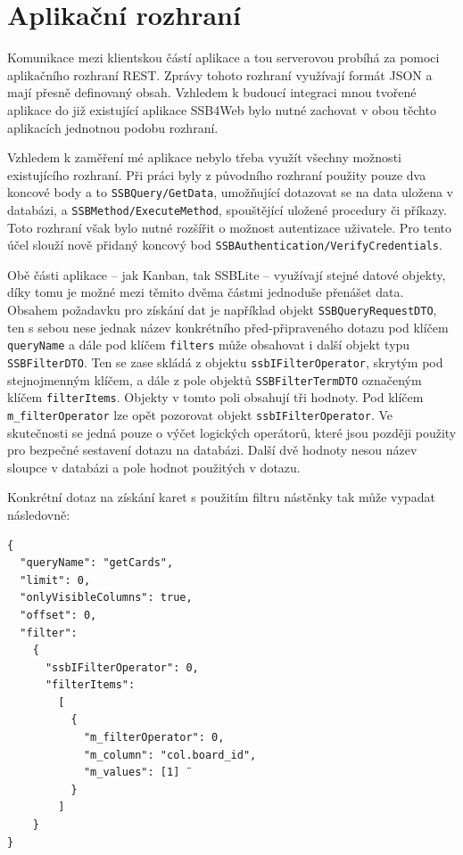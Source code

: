 \section{Aplikační rozhraní}\label{sec:api}
Komunikace mezi klientskou částí aplikace a tou serverovou probíhá za pomoci aplikačního rozhraní REST. Zprávy tohoto rozhraní využívají formát JSON a mají přesně definovaný obsah.
Vzhledem k budoucí integraci mnou tvořené aplikace do již existující aplikace SSB4Web bylo nutné zachovat v obou těchto aplikacích jednotnou podobu rozhraní.

Vzhledem k zaměření mé aplikace nebylo třeba využít všechny možnosti existujícího rozhraní. Při práci byly z původního rozhraní použity pouze dva koncové body a to \texttt{SSBQuery/GetData}, umožňující dotazovat se na data uložena v databázi, a \sloppy\texttt{SSBMethod/ExecuteMethod}, spouštějící uložené procedury či příkazy. Toto rozhraní však bylo nutné rozšířit o možnost autentizace uživatele. Pro tento účel slouží nově přidaný koncový bod \sloppy\texttt{SSBAuthentication/VerifyCredentials}.

Obě části aplikace -- jak Kanban, tak SSBLite -- využívají stejné datové objekty, díky tomu je možné mezi těmito dvěma částmi jednoduše přenášet data. Obsahem požadavku pro získání dat je například objekt \texttt{SSBQueryRequestDTO}, ten s sebou nese jednak název konkrétního před-připraveného dotazu pod klíčem \texttt{queryName} a dále pod klíčem \texttt{filters} může obsahovat i další objekt typu \texttt{SSBFilterDTO}. Ten se zase skládá z objektu \texttt{ssbIFilterOperator}, skrytým pod stejnojmenným klíčem, a dále z pole objektů \texttt{SSBFilterTermDTO} označeným klíčem \texttt{filterItems}. Objekty v tomto poli obsahují tři hodnoty. Pod klíčem \texttt{m\_filterOperator} lze opět pozorovat objekt \texttt{ssbIFilterOperator}. Ve skutečnosti se jedná pouze o výčet logických operátorů, které jsou později použity pro bezpečné sestavení dotazu na databázi. Další dvě hodnoty nesou název sloupce v databázi a pole hodnot použitých v dotazu.

Konkrétní dotaz na získání karet s použitím filtru nástěnky tak může vypadat následovně:

\begin{verbatim}
{
  "queryName": "getCards",
  "limit": 0,
  "onlyVisibleColumns": true,
  "offset": 0,
  "filter":
    {
      "ssbIFilterOperator": 0,
      "filterItems":
        [
          {
            "m_filterOperator": 0,
            "m_column": "col.board_id",
            "m_values": [1] ¨
          }
        ]
    }
}
\end{verbatim}

